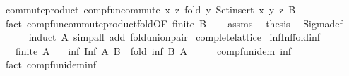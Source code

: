 \begin{isabellebody}
\ commute{\isacharunderscore}{\kern0pt}product{\isacharcolon}{\kern0pt}\ comp{\isacharunderscore}{\kern0pt}fun{\isacharunderscore}{\kern0pt}commute\ {\isachardoublequoteopen}{\isacharparenleft}{\kern0pt}{\isasymlambda}x\ z{\isachardot}{\kern0pt}\ fold\ {\isacharparenleft}{\kern0pt}{\isasymlambda}y{\isachardot}{\kern0pt}\ Set{\isachardot}{\kern0pt}insert\ {\isacharparenleft}{\kern0pt}x{\isacharcomma}{\kern0pt}\ y{\isacharparenright}{\kern0pt}{\isacharparenright}{\kern0pt}\ z\ B{\isacharparenright}{\kern0pt}{\isachardoublequoteclose}\isanewline
\ \ \ \ \isamarkupfalse%
\ {\isacharparenleft}{\kern0pt}fact\ comp{\isacharunderscore}{\kern0pt}fun{\isacharunderscore}{\kern0pt}commute{\isacharunderscore}{\kern0pt}product{\isacharunderscore}{\kern0pt}fold{\isacharbrackleft}{\kern0pt}OF\ {\isacartoucheopen}finite\ B{\isacartoucheclose}{\isacharbrackright}{\kern0pt}{\isacharparenright}{\kern0pt}\isanewline
\ \ \isamarkupfalse%
\ assms\ \isamarkupfalse%
\ {\isacharquery}{\kern0pt}thesis\ \isamarkupfalse%
\ Sigma{\isacharunderscore}{\kern0pt}def\isanewline
\ \ \ \ \isamarkupfalse%
\ {\isacharparenleft}{\kern0pt}induct\ A{\isacharparenright}{\kern0pt}\ {\isacharparenleft}{\kern0pt}simp{\isacharunderscore}{\kern0pt}all\ add{\isacharcolon}{\kern0pt}\ fold{\isacharunderscore}{\kern0pt}union{\isacharunderscore}{\kern0pt}pair{\isacharparenright}{\kern0pt}\isanewline
{}\isamarkupfalse%
%
\endisatagproof
{\isafoldproof}%
%
\isadelimproof
\isanewline
%
\endisadelimproof
\isanewline
{}\isamarkupfalse%
\ complete{\isacharunderscore}{\kern0pt}lattice\isanewline
{}\isanewline
\isanewline
{}\isamarkupfalse%
\ inf{\isacharunderscore}{\kern0pt}Inf{\isacharunderscore}{\kern0pt}fold{\isacharunderscore}{\kern0pt}inf{\isacharcolon}{\kern0pt}\isanewline
\ \ \ {\isachardoublequoteopen}finite\ A{\isachardoublequoteclose}\isanewline
\ \ \ {\isachardoublequoteopen}inf\ {\isacharparenleft}{\kern0pt}Inf\ A{\isacharparenright}{\kern0pt}\ B\ {\isacharequal}{\kern0pt}\ fold\ inf\ B\ A{\isachardoublequoteclose}\isanewline
%
\isadelimproof
%
\endisadelimproof
%
\isatagproof
{}\isamarkupfalse%
\ {\isacharminus}{\kern0pt}\isanewline
\ \ \isamarkupfalse%
\ comp{\isacharunderscore}{\kern0pt}fun{\isacharunderscore}{\kern0pt}idem\ inf\isanewline
\ \ \ \ \isamarkupfalse%
\ {\isacharparenleft}{\kern0pt}fact\ comp{\isacharunderscore}{\kern0pt}fun{\isacharunderscore}{\kern0pt}idem{\isacharunderscore}{\kern0pt}inf{\isacharparenright}{\kern0pt}\isanewline

\end{isabellebody}
